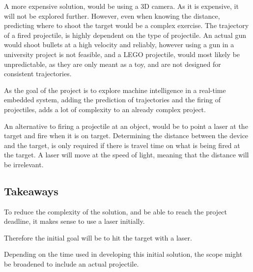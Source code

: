 A more expensive solution, would be using a 3D camera.
As it is expensive, it will not be explored further.
However, even when knowing the distance, predicting where to shoot the target would be a complex exercise.
The trajectory of a fired projectile, is highly dependent on the type of projectile.
An actual gun would shoot bullets at a high velocity and reliably, however using a gun in a university project is not feasible, and a LEGO projectile, would most likely be unpredictable, as they are only meant as a toy, and are not designed for consistent trajectories.


As the goal of the project is to explore machine intelligence in a real-time embedded system, adding the prediction of trajectories and the firing of projectiles, adds a lot of complexity to an already complex project.

An alternative to firing a projectile at an object, would be to point a laser at the target and fire when it is on target.
Determining the distance between the device and the target, is only required if there is travel time on what is being fired at the target.
A laser will move at the speed of light, meaning that the distance will be irrelevant.


\subsection{Takeaways}\label{anal:laser:takeaway}
To reduce the complexity of the solution, and be able to reach the project deadline, it makes sense to use a laser initially. 

Therefore the initial goal will be to hit the target with a laser.

Depending on the time used in developing this initial solution, the scope might be broadened to include an actual projectile.
